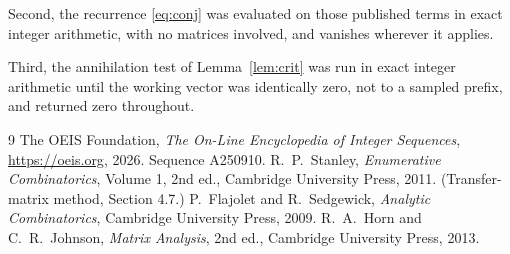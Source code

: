 \documentclass[11pt,a4paper]{article}
\theoremstyle{plain}
\theoremstyle{definition}
\begin{document}
Second, the recurrence \eqref{eq:conj} was evaluated on those published terms in exact
integer arithmetic, with no matrices involved, and vanishes wherever it applies.

Third, the annihilation test of Lemma~\ref{lem:crit} was run in exact integer arithmetic
until the working vector was identically zero, not to a sampled prefix, and returned zero
throughout.

\begin{thebibliography}{9}
 The OEIS Foundation, \emph{The On-Line Encyclopedia of Integer
Sequences}, \url{https://oeis.org}, 2026. Sequence A250910.
 R.~P.~Stanley, \emph{Enumerative Combinatorics}, Volume 1, 2nd ed.,
Cambridge University Press, 2011. (Transfer-matrix method, Section 4.7.)
 P.~Flajolet and R.~Sedgewick, \emph{Analytic Combinatorics}, Cambridge
University Press, 2009.
 R.~A.~Horn and C.~R.~Johnson, \emph{Matrix Analysis}, 2nd ed., Cambridge
University Press, 2013.
\end{thebibliography}
\end{document}
